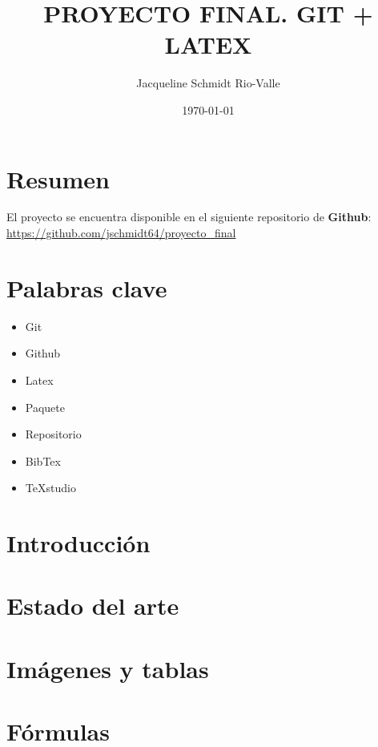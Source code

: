 \documentclass[a4paper,11pt]{article}
\title{\Huge{\textbf{PROYECTO FINAL. GIT + LATEX}}}
\author{\LARGE{Jacqueline Schmidt Rio-Valle}}
\date{\today}
\begin{document}
\maketitle	
	
\newpage	
	
\tableofcontents	

\newpage
	
\section{Resumen}

El proyecto se encuentra disponible en el siguiente repositorio de \textbf{Github}: \url{https://github.com/jschmidt64/proyecto_final}

\section{Palabras clave}

\begin{itemize}
	\item Git
	\item Github
	\item Latex
	\item Paquete
	\item Repositorio
	\item BibTex
	\item TeXstudio
\end{itemize}

\section{Introducción}



\section{Estado del arte}


\section{Imágenes y tablas}


\section{Fórmulas}




\nocite{*}
\end{document}
